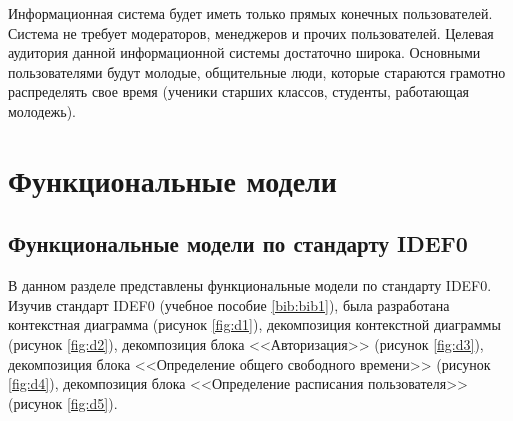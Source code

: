 \documentclass[14pt]{extreport}
\begin{document}
Информационная система будет иметь только прямых конечных пользователей. Система не требует модераторов, менеджеров и прочих пользователей.
Целевая аудитория данной информационной системы достаточно широка. Основными пользователями будут молодые, общительные люди, которые стараются грамотно распределять свое время (ученики старших классов, студенты, работающая молодежь).


\chapter{Функциональные модели}

\section{Функциональные модели по стандарту IDEF0}
В данном разделе представлены функциональные модели по стандарту IDEF0. Изучив стандарт IDEF0 (учебное пособие \ref{bib:bib1}), была разработана контекстная диаграмма (рисунок \ref{fig:d1}), декомпозиция контекстной диаграммы (рисунок \ref{fig:d2}),  декомпозиция блока <<Авторизация>> (рисунок \ref{fig:d3}), декомпозиция блока <<Определение общего свободного времени>> (рисунок \ref{fig:d4}), декомпозиция блока <<Определение расписания пользователя>> (рисунок \ref{fig:d5}).
\end{document}

